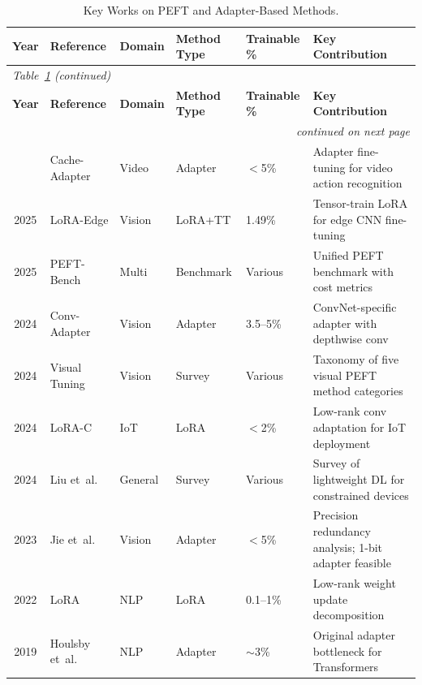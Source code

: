 \documentclass[12pt, a4paper]{report}
\numberwithin{equation}{chapter}
\numberwithin{figure}{chapter}
\numberwithin{table}{chapter}
\numberwithin{algorithm}{chapter}
\begin{document}
{\footnotesize
\renewcommand{\arraystretch}{0.95}
\begin{longtable}{@{}c l l l l p{4cm}@{}}
\caption{Key Works on PEFT and Adapter-Based Methods.}
\label{tab:related_peft}\\
\toprule
\textbf{Year} & \textbf{Reference} & \textbf{Domain} & \textbf{Method Type} & \textbf{Trainable \%} & \textbf{Key Contribution} \\
\midrule
\endfirsthead
\multicolumn{6}{l}{\footnotesize\emph{Table~\ref{tab:related_peft} (continued)}}\\
\toprule
\textbf{Year} & \textbf{Reference} & \textbf{Domain} & \textbf{Method Type} & \textbf{Trainable \%} & \textbf{Key Contribution} \\
\midrule
\endhead
\midrule
\multicolumn{6}{r}{\footnotesize\emph{continued on next page}}\\
\endfoot
\bottomrule
\endlastfoot
2025 & Cache-Adapter \cite{Lu2025CacheAdapter}     & Video    & Adapter   & $<$5\%    & Adapter fine-tuning for video action recognition \\
2025 & LoRA-Edge \cite{Kwak2025LoRAEdge}            & Vision   & LoRA+TT   & 1.49\%    & Tensor-train LoRA for edge CNN fine-tuning \\
2025 & PEFT-Bench \cite{Belanec2025PEFTBench}       & Multi    & Benchmark & Various   & Unified PEFT benchmark with cost metrics \\
2024 & Conv-Adapter \cite{Chen2024ConvAdapter}       & Vision   & Adapter   & 3.5--5\%  & ConvNet-specific adapter with depthwise conv \\
2024 & Visual Tuning \cite{Yu2024VisualTuning}       & Vision   & Survey    & Various   & Taxonomy of five visual PEFT method categories \\
2024 & LoRA-C \cite{Ding2024LoRAC}                   & IoT      & LoRA      & $<$2\%    & Low-rank conv adaptation for IoT deployment \\
2024 & Liu et~al. \cite{Liu2024LightweightDLSurvey}  & General  & Survey    & Various   & Survey of lightweight DL for constrained devices \\
2023 & Jie et~al. \cite{Jie2023PrecisionRedundancy}   & Vision   & Adapter   & $<$5\%    & Precision redundancy analysis; 1-bit adapter feasible \\
2022 & LoRA \cite{Hu2022LoRA}                         & NLP      & LoRA      & 0.1--1\%  & Low-rank weight update decomposition \\
2019 & Houlsby et~al. \cite{Houlsby2019Adapters}      & NLP      & Adapter   & $\sim$3\% & Original adapter bottleneck for Transformers \\
\end{longtable}
}
\end{document}
